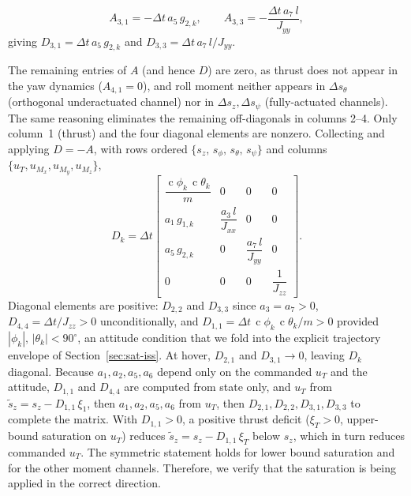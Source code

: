 \documentclass[conf]{new-aiaa}
\DeclareMathOperator{\cs}{c}
\begin{document}
\begin{equation}
\label{eq:sat-A-pitch}
A_{3,1} = -\Delta t\, a_5\, g_{2,k},
\qquad
A_{3,3} = -\frac{\Delta t\, a_7\, l}{J_{yy}},
\end{equation}
giving $D_{3,1} = \Delta t\, a_5\, g_{2,k}$ and $D_{3,3} = \Delta t\, a_7\, l/J_{yy}$.

The remaining entries of $A$ (and hence $D$) are zero, as thrust does not appear in the yaw dynamics ($A_{4,1} = 0$), and roll moment neither appears in $\Delta s_\theta$ (orthogonal underactuated channel) nor in $\Delta s_z, \Delta s_\psi$ (fully-actuated channels). The same reasoning eliminates the remaining off-diagonals in columns 2–4. Only column~1 (thrust) and the four diagonal elements are nonzero. Collecting and applying $D = -A$, with rows ordered $\{s_z,\, s_\phi,\, s_\theta,\, s_\psi\}$ and columns $\{u_T, u_{M_x}, u_{M_y}, u_{M_z}\}$,
\small
\begin{equation}
\label{eq:sat-D-matrix}
D_k = \Delta t
\begin{bmatrix}
\dfrac{\cs\phi_k\, \cs\theta_k}{m} & 0 & 0 & 0 \\[0.8em]
a_1\, g_{1,k} & \dfrac{a_3\, l}{J_{xx}} & 0 & 0 \\[0.8em]
a_5\, g_{2,k} & 0 & \dfrac{a_7\, l}{J_{yy}} & 0 \\[0.8em]
0 & 0 & 0 & \dfrac{1}{J_{zz}}
\end{bmatrix}.
\end{equation}
\normalsize
Diagonal elements are positive: $D_{2,2}$ and $D_{3,3}$ since $a_3 = a_7 > 0$, $D_{4,4} = \Delta t / J_{zz} > 0$ unconditionally, and $D_{1,1} = \Delta t\, \cs\phi_k\, \cs\theta_k / m > 0$ provided $|\phi_k|,\, |\theta_k| < 90^{\circ}$, an attitude condition that we fold into the explicit trajectory envelope of Section~\ref{sec:sat-iss}. At hover, $D_{2,1}$ and $D_{3,1} \to 0$, leaving $D_k$ diagonal. Because $a_1, a_2, a_5, a_6$ depend only on the commanded $u_T$ and the attitude, $D_{1,1}$ and $D_{4,4}$ are computed from state only, and $u_T$ from $\tilde s_z = s_z - D_{1,1}\,\xi_1$, then $a_1, a_2, a_5, a_6$ from $u_T$, then $D_{2,1}, D_{2,2}, D_{3,1}, D_{3,3}$ to complete the matrix. With $D_{1,1} > 0$, a positive thrust deficit ($\xi_T > 0$, upper-bound saturation on $u_T$) reduces $\tilde s_z = s_z - D_{1,1}\, \xi_T$ below $s_z$, which in turn reduces commanded $u_T$. The symmetric statement holds for lower bound saturation and for the other moment channels. Therefore, we verify that the saturation is being applied in the correct direction. 
\end{document}
